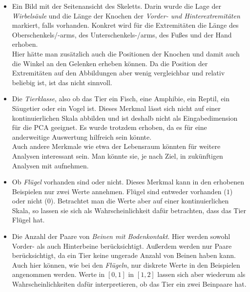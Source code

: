  \begin{itemize}
  \item Ein Bild mit der Seitenansicht des Skeletts.
  Darin wurde die Lage der \emph{Wirbelsäule} und die Länge der Knochen der \emph{Vorder- und Hinterextremitäten} markiert, falls vorhanden. Konkret wird für die Extremitäten die Länge des Oberschenkels/-arms, des Unterschenkels-/arms, des Fußes und der Hand erhoben.\\
  Hier hätte man zusätzlich auch die Positionen der Knochen und damit auch die Winkel an den Gelenken erheben können. Da die Position der Extremitäten auf den Abbildungen aber wenig vergleichbar und relativ beliebig ist, ist das nicht sinnvoll.
  
  \item Die \emph{Tierklasse}, also ob das Tier ein Fisch, eine Amphibie, ein Reptil, ein Säugetier oder ein Vogel ist. Dieses Merkmal lässt sich nicht auf einer kontinuierlichen Skala abbilden und ist deshalb nicht als Eingabedimension für die PCA geeignet. Es wurde trotzdem erhoben, da es für eine anderweitige Auswertung hilfreich sein könnte.\\
  Auch andere Merkmale wie etwa der Lebensraum könnten für weitere Analysen interessant sein. Man könnte sie, je nach Ziel, in zukünftigen Analysen mit aufnehmen.
  
  \item Ob \emph{Flügel} vorhanden sind oder nicht. Dieses Merkmal kann in den erhobenen Beispielen nur zwei Werte annehmen. Flügel sind entweder vorhanden ($1$) oder nicht ($0$). Betrachtet man die Werte aber auf einer kontinuierlichen Skala, so lassen sie sich als Wahrscheinlichkeit dafür betrachten, dass das Tier Flügel hat.
  
  \item Die Anzahl der Paare von \emph{Beinen mit Bodenkontakt}. Hier werden sowohl Vorder- als auch Hinterbeine berücksichtigt. Außerdem werden nur Paare berücksichtigt, da ein Tier keine ungerade Anzahl von Beinen haben kann.\\
  Auch hier können, wie bei den \emph{Flügeln}, nur diskrete Werte in den Beispielen angenommen werden. Werte in $[0, 1]$ \bzw in $[1, 2]$ lassen sich aber wiederum als Wahrscheinlichkeiten dafür interpretieren, ob das Tier ein \bzw zwei Beinpaare hat.
  

\end{itemize}
